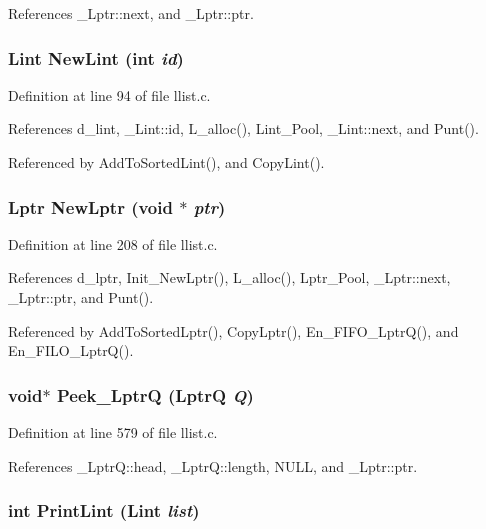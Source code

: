 References \_\-Lptr::next, and \_\-Lptr::ptr.
\subsubsection{\setlength{\rightskip}{0pt plus 5cm}\bf{Lint} New\-Lint (int {\em id})}\label{llist_8c_c284645effb44db37e098aa125e74507}




Definition at line 94 of file llist.c.

References d\_\-lint, \_\-Lint::id, L\_\-alloc(), Lint\_\-Pool, \_\-Lint::next, and Punt().

Referenced by Add\-To\-Sorted\-Lint(), and Copy\-Lint().
\subsubsection{\setlength{\rightskip}{0pt plus 5cm}\bf{Lptr} New\-Lptr (void $\ast$ {\em ptr})}\label{llist_8c_ed0767ec2ada56f7616613df6631082d}




Definition at line 208 of file llist.c.

References d\_\-lptr, Init\_\-New\-Lptr(), L\_\-alloc(), Lptr\_\-Pool, \_\-Lptr::next, \_\-Lptr::ptr, and Punt().

Referenced by Add\-To\-Sorted\-Lptr(), Copy\-Lptr(), En\_\-FIFO\_\-Lptr\-Q(), and En\_\-FILO\_\-Lptr\-Q().
\subsubsection{\setlength{\rightskip}{0pt plus 5cm}void$\ast$ Peek\_\-Lptr\-Q (\bf{Lptr\-Q} {\em Q})}\label{llist_8c_0afd3f316caf055b52bf9d541b63f355}




Definition at line 579 of file llist.c.

References \_\-Lptr\-Q::head, \_\-Lptr\-Q::length, NULL, and \_\-Lptr::ptr.
\subsubsection{\setlength{\rightskip}{0pt plus 5cm}int Print\-Lint (\bf{Lint} {\em list})}\label{llist_8c_dff62d906c3b1ccec4c8f57dcf0ae2ae}




